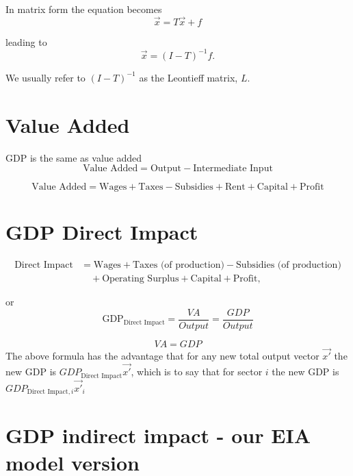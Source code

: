 \documentclass[12pt]{article}
\begin{document}
In matrix form the equation becomes
\begin{equation}
\vec{x} = T \vec{x} + f
\end{equation}


leading to
\begin{equation}
\vec{x} = (I-T)^{-1}f.
\end{equation}

We usually refer to $(I-T)^{-1}$ as the Leontieff matrix, $L$.

\section{Value Added}
GDP is the same as value added
\begin{equation}
\text{Value Added} = \text{Output} - \text{Intermediate Input} 
\end{equation}

\begin{equation}
\text{Value Added} = \text{Wages} + \text{Taxes} - \text{Subsidies} + \text{Rent} +\text{Capital} + \text{Profit}
\end{equation}

\section{GDP Direct Impact}

\begin{equation}
\begin{aligned}
\text{Direct Impact} &= \text{Wages} + \text{Taxes (of production)} - \text{Subsidies (of production)} \\
&\quad + \text{Operating Surplus} + \text{Capital} + \text{Profit},
\end{aligned}
\end{equation}

or
\begin{equation}
\text{GDP}_{\text{Direct Impact}} = \frac{VA}{Output} = \frac{GDP}{Output}
\end{equation}

\begin{equation}
VA = GDP
\end{equation}
%
The above formula has the advantage that for any new total output vector $\vec{x'}$ the new GDP is $GDP_{\text{Direct Impact}}\vec{x'}$, which is to say that for sector $i$ the new GDP is $GDP_{\text{Direct Impact},i}\vec{x'}_i$
%

\section{GDP indirect impact - our EIA model version}
\end{document}
